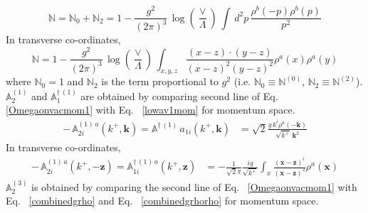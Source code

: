 \documentclass[aps,prd,amsmath,amssymb,nofootinbib]{revtex4-2}
\def\mf#1{\mathbb{#1}}
\numberwithin{equation}{section}
\begin{document}
\begin{equation}\label{Ncoeffmom}
    \mf{N} =  \mf{N}_0 +  \mf{N}_2 = 1- \frac{g^{2}}{(2\pi)^{3}}\, \log{\left(\frac{\vee}{\Lambda}\right)}\,\int\, d^{2}p\,\frac{\rho^{b}(-p)\rho^{b}(p)}{p^{2}}
\end{equation}
In transverse co-ordinates,
\begin{equation}\label{eq:Ncoeffpos}
    \mf{N}  = 1 -
    \frac{g^{2}}{(2\pi)^{3}}\, \log{\left(\frac{\vee}{\Lambda}\right)}\, \int_{x,y,z}\frac{(x-z)\cdot (y-z)}{(x-z)^{2}(y-z)^{2}}\rho^{a}(x)\rho^{a}(y)
\end{equation}
where  $ \mf{N}_0=1$ and  $\mf{N}_2$ is the term proportional to $g^2$ (i.e. $\mf{N}_0\equiv\mf{N}^{(0)}$, $\mf{N}_2\equiv\mf{N}^{(2)}$).$\mf{A}^{(1)}_{2}$ and $\mf{A}^{\dagger\, (1)}_{1}$ are obtained by comparing second line of Eq.~ \eqref{Omegaonvacmom1} with Eq.~ \eqref{lowav1mom} for momentum space. 
\begin{align}
\label{A1coeffM}
  -\,\mf{A}^{(1)\,a}_{2i}(k^{+},\mathbf{k}) =  \mf{A}^{\dagger\,(1)}\,a_{ 1 i}(k^{+},\mathbf{k}) & = \sqrt{2} \frac{g\,k^{i}\rho^{a}(-\mathbf{k})}{ \sqrt{k^{+}}\,\mathbf{k}^{2}} 
\end{align}
In transverse co-ordinates,
\begin{align}
\label{A1coeff}
  -\, \mf{A}^{(1)\,a}_{2i}(k^{+},-\mathbf{z}) =   \mf{A}^{\dagger\,(1)\,a}_{1 i}(k^{+},\mathbf{z}) & = - \frac{1}{\sqrt{2}\pi}\frac{ig}{\sqrt{k^+}}\int_{x}\frac{(\mathbf{x}-\mathbf{z})^{i}}{(\mathbf{x}-\mathbf{z})^{2}} \rho^{a}(\mathbf{x}) 
\end{align}
$ \mf{A}^{(3)}_{2}$ is obtained by comparing the second line of Eq.~ \eqref{Omegaonvacmom1} with Eq.~ \eqref{combinedgrho} and Eq.~ \eqref{combinedgrhorho} for momentum space. 
\end{document}
